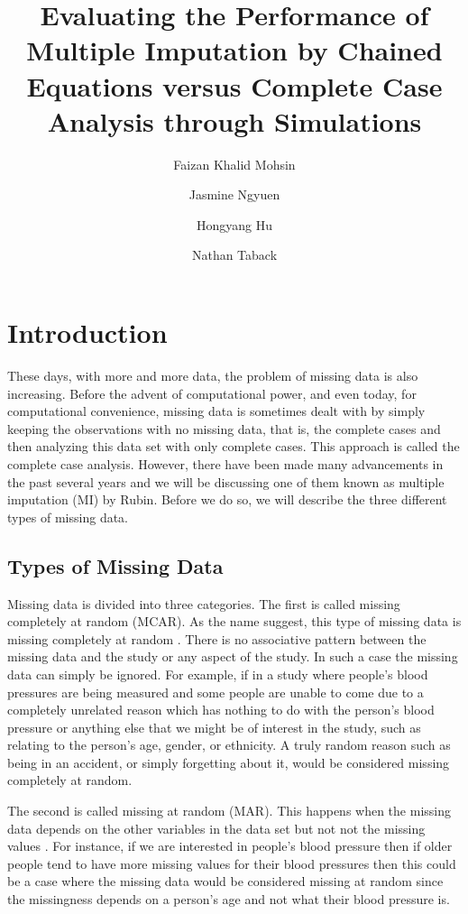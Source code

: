 \documentclass[fleqn,10pt]{wlscirep}\usepackage[]{graphicx}\usepackage[]{color}
\title{Evaluating the Performance of Multiple Imputation by Chained Equations versus Complete Case Analysis through Simulations}
\author[1,*]{Faizan Khalid Mohsin}
\author[2]{Jasmine Ngyuen}
\author[2]{Hongyang Hu}
\author[2]{Nathan Taback}
\affil[1]{University of Toronto, Dalla Lana School of Public Health, Toronto, Canada}
\affil[2]{University of Toronto, Department of Statistical Sciences, Toronto, Canada}
\affil[*]{faizan.mohsin@mail.utoronto.ca}
\begin{document}
\flushbottom
\maketitle

\thispagestyle{empty}

\newpage

\section{Introduction}

These days, with more and more data, the problem of missing data is also increasing. Before the advent of computational power, and even today, for computational convenience, missing data is sometimes dealt with by simply keeping the observations with no missing data, that is, the complete cases and then analyzing this data set with only complete cases. This approach is called the complete case analysis. However, there have been made many advancements in the past several years and we will be discussing one of them known as multiple imputation (MI) by Rubin. Before we do so, we will describe the three different types of missing data. 

\subsection{Types of Missing Data}

Missing data is divided into three categories. The first is called missing completely at random (MCAR). As the name suggest, this type of missing data is missing completely at random \cite{allison2012handling}. There is no associative pattern between the missing data and the study or any aspect of the study. In such a case the missing data can simply be ignored. For example, if in a study where people's blood pressures are being measured and some people are unable to come due to a completely unrelated reason which has nothing to do with the person's blood pressure or anything else that we might be of interest in the study, such as relating to the person's age, gender, or ethnicity. A truly random reason such as being in an accident, or simply forgetting about it, would be considered missing completely at random.  

The second is called missing at random (MAR). This happens when the missing data depends on the other variables in the data set but not not the missing values \cite{allison2012handling}. For instance, if we are interested in people's blood pressure then if older people tend to have more missing values for their blood pressures then this could be a case where the missing data would be considered missing at random since the missingness depends on a person's age and not what their blood pressure is.  
\end{document}
